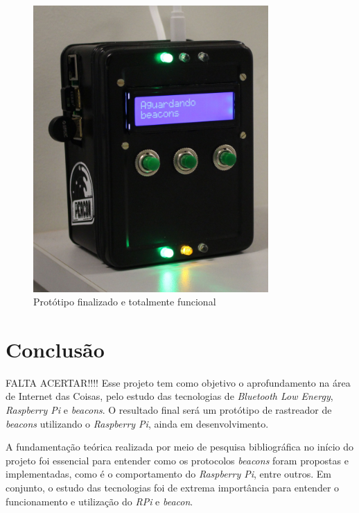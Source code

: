 \documentclass[
		12pt,				%
		openright,			%
		oneside,			%
		a4paper,			%
		chapter=TITLE,		%
		english,			%
		brazil				%
	]{abntex2}
\begin{document}
\begin{figure}[htb]
	\caption{\label{fig:prod-final}Protótipo finalizado e totalmente funcional}
	\begin{center}
		\includegraphics[width=0.8\textwidth]{img/prod-final.jpg}
	\end{center}
\end{figure}



\chapter{Conclusão}

FALTA ACERTAR!!!! Esse projeto tem como objetivo o aprofundamento na área de Internet das Coisas, pelo estudo das tecnologias de \textit{Bluetooth Low Energy}, \textit{Raspberry Pi} e \textit{beacons}. O resultado final será um protótipo de rastreador de \textit{beacons} utilizando o \textit{Raspberry Pi}, ainda em desenvolvimento.

A fundamentação teórica realizada por meio de pesquisa bibliográfica no início do projeto foi essencial para entender como os protocolos \textit{beacons} foram propostas e implementadas, como é o comportamento do \textit{Raspberry Pi}, entre outros. Em conjunto, o estudo das tecnologias foi de extrema importância para entender o funcionamento e utilização do \textit{RPi} e \textit{beacon}.
\end{document}
